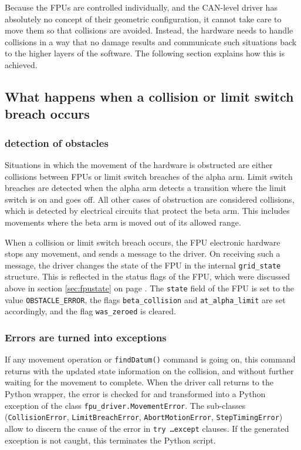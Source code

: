 \documentclass[11pt,a4paper]{report}
\begin{document}
Because the FPUs are controlled individually, and the CAN-level driver
has absolutely no concept of their geometric configuration, it cannot
take care to move them so that collisions are avoided.  Instead, the
hardware needs to handle collisions in a way that no damage results
and communicate such situations back to the higher layers of the
software. The following section explains how this is achieved.

\subsection{What happens when a collision or limit switch breach occurs}
\subsubsection{detection of obstacles}

Situations in which the movement of the hardware is obstructed are
either collisions between FPUs or limit switch breaches of the alpha
arm. Limit switch breaches are detected when the alpha arm detects a
transition where the limit switch is on and goes off. All other cases
of obstruction are considered collisions, which is detected by
electrical circuits that protect the beta arm. This includes movements
where the beta arm is moved out of its allowed range.

When a collision or limit switch breach occurs, the FPU electronic
hardware stops any movement, and sends a message to the driver. On
receiving such a message, the driver changes the state of the FPU in
the internal \texttt{grid\_state} structure. This is reflected in the
status flags of the FPU, which were discussed above in section
\ref{sec:fpustate} on page \pageref{sec:fpustate}.  The \texttt{state}
field of the FPU is set to the value \texttt{OBSTACLE\_ERROR}, the
flags \texttt{beta\_collision} and \texttt{at\_alpha\_limit} are set
accordingly, and the flag \texttt{was\_zeroed} is cleared.


\subsubsection{Errors are turned into exceptions}

If any movement operation or \texttt{findDatum()} command is going on,
this command returns with the updated state information on the
collision, and without further waiting for the movement to complete.
When the driver call returns to the Python wrapper, the error is
checked for and transformed into a Python exception of the class
\texttt{fpu\_driver.MovementError}. The sub-classes
(\texttt{CollisionError}, \texttt{LimitBreachError},
\texttt{AbortMotionError}, \texttt{StepTimingError}) allow to discern
the cause of the error in \texttt{try \ldots except} clauses.  If the
generated exception is not caught, this terminates the Python script.
\end{document}
